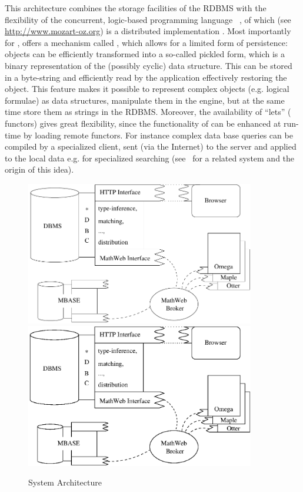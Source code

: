 This architecture combines the storage facilities of the RDBMS with the
flexibility of the concurrent, logic-based programming language
{\oz}~\cite{Smolka:Oz:95}, of which {\mozart} (see
{\url{http://www.mozart-oz.org}}) is a distributed implementation .  Most
importantly for {\mbase}, {\mozart} offers a mechanism called {},
which allows for a limited form of persistence: {\mozart} objects can be
efficiently transformed into a so-called pickled form, which is a binary
representation of the (possibly cyclic) data structure.  This can be stored in a
byte-string and efficiently read by the {\mozart} application effectively
restoring the object.  This feature makes it possible to represent complex objects
(e.g. logical formulae) as {\oz} data structures, manipulate them in the {\mozart}
engine, but at the same time store them as strings in the RDBMS. Moreover, the
availability of ``{\oz}lets'' ({\mozart} functors) gives {\mbase} great
flexibility, since the functionality of {\mbase} can be enhanced at run-time by
loading remote functors. For instance complex data base queries can be compiled by
a specialized {\mbase} client, sent (via the Internet) to the {\mbase} server and
applied to the local data e.g. for specialized searching
(see~\cite{Duchier:tntb98} for a related system and the origin of this idea).

\begin{figure}
  \begin{center}
    \ifpdf\includegraphics[width=10cm]{mbase.pdf}
    \else\includegraphics[width=10cm]{mbase.eps}\fi
    \caption{System Architecture}
    \label{fig:mbase}
  \end{center}
\end{figure}

